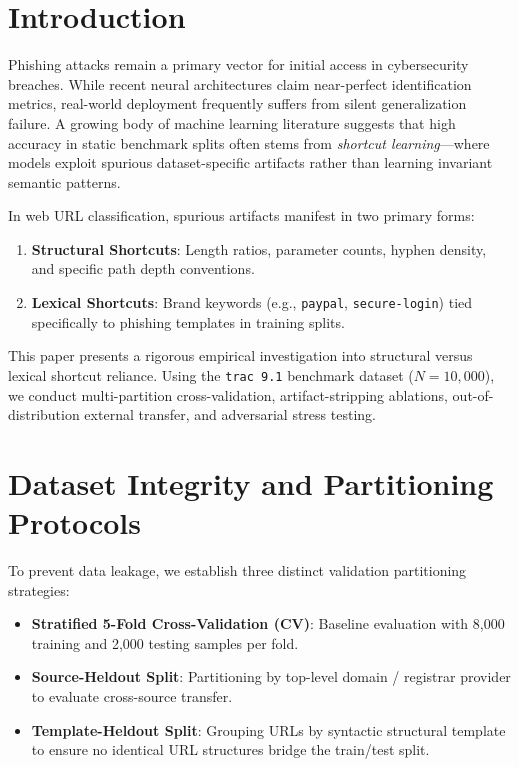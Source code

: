 \documentclass[conference,10pt]{IEEEtran}
\begin{document}
\section{Introduction}
Phishing attacks remain a primary vector for initial access in cybersecurity breaches. While recent neural architectures claim near-perfect identification metrics, real-world deployment frequently suffers from silent generalization failure. A growing body of machine learning literature suggests that high accuracy in static benchmark splits often stems from \emph{shortcut learning}---where models exploit spurious dataset-specific artifacts rather than learning invariant semantic patterns.

In web URL classification, spurious artifacts manifest in two primary forms:
\begin{enumerate}
    \item \textbf{Structural Shortcuts}: Length ratios, parameter counts, hyphen density, and specific path depth conventions.
    \item \textbf{Lexical Shortcuts}: Brand keywords (e.g., \texttt{paypal}, \texttt{secure-login}) tied specifically to phishing templates in training splits.
\end{enumerate}

This paper presents a rigorous empirical investigation into structural versus lexical shortcut reliance. Using the \texttt{trac 9.1} benchmark dataset ($N=10,000$), we conduct multi-partition cross-validation, artifact-stripping ablations, out-of-distribution external transfer, and adversarial stress testing.

\section{Dataset Integrity and Partitioning Protocols}
To prevent data leakage, we establish three distinct validation partitioning strategies:
\begin{itemize}
    \item \textbf{Stratified 5-Fold Cross-Validation (CV)}: Baseline evaluation with 8,000 training and 2,000 testing samples per fold.
    \item \textbf{Source-Heldout Split}: Partitioning by top-level domain / registrar provider to evaluate cross-source transfer.
    \item \textbf{Template-Heldout Split}: Grouping URLs by syntactic structural template to ensure no identical URL structures bridge the train/test split.
\end{itemize}
\end{document}
